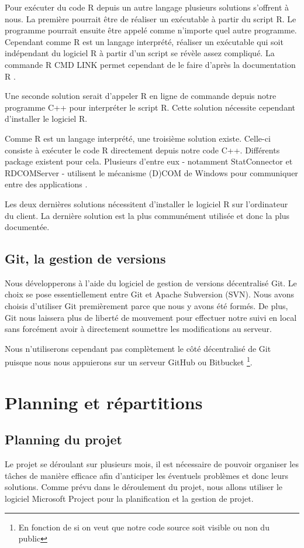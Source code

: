 	Pour exécuter du code R depuis un autre langage plusieurs solutions s'offrent à nous. La première pourrait être de réaliser un exécutable à partir du script R. Le programme pourrait ensuite être appelé comme n'importe quel autre programme. Cependant comme R est un langage interprété, réaliser un exécutable qui soit indépendant du logiciel R à partir d'un script se révèle assez compliqué. La commande R CMD LINK permet cependant de le faire d'après la documentation R \cite{website:R-LINK}.

	Une seconde solution serait d'appeler R en ligne de commande depuis notre programme C++ pour interpréter le script R. Cette solution nécessite cependant d'installer le logiciel R.

	Comme R est un langage interprété, une troisième solution existe. Celle-ci consiste à exécuter le code R directement depuis notre code C++. Différents package existent pour cela. Plusieurs d'entre eux - notamment StatConnector et RDCOMServer - utilisent le mécanisme (D)COM de Windows pour communiquer entre des applications \cite{website:R-under-Windows}.

	Les deux dernières solutions nécessitent d'installer le logiciel R sur l'ordinateur du client. La dernière solution est la plus communément utilisée et donc la plus documentée. 


\subsection{Git, la gestion de versions}
	Nous développerons à l'aide du logiciel de gestion de versions décentralisé Git. Le choix se pose essentiellement entre Git et Apache Subversion (SVN). Nous avons choisis d'utiliser Git premièrement parce que nous y avons été formés. De plus, Git nous laissera plus de liberté de mouvement pour effectuer notre suivi en local sans forcément avoir à directement soumettre les modifications au serveur.

	Nous n'utiliserons cependant pas complètement le côté décentralisé de Git puisque nous nous appuierons sur un serveur GitHub ou Bitbucket \footnote{En fonction de si on veut que notre code source soit visible ou non du public}.


\section{Planning et répartitions}

\subsection{Planning du projet}
	Le projet se déroulant sur plusieurs mois, il est nécessaire de pouvoir organiser les tâches de manière efficace afin d'anticiper les éventuels problèmes et donc leurs solutions. Comme prévu dans le déroulement du projet, nous allons utiliser le logiciel Microsoft Project pour la planification et la gestion de projet.

